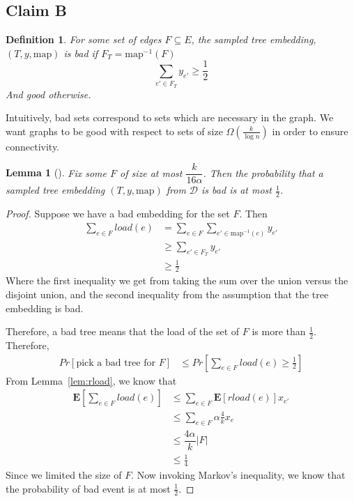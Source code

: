 \documentclass[12pt]{article}
\newtheorem{definition}{Definition}
\newtheorem{lemma}{Lemma}
\begin{document}
\subsection{Claim B}

\begin{definition}
For some set of edges $F \subseteq E$, the sampled tree embedding, $(T, y, \text{map})$ is bad if $F_T = \text{map}^{-1}(F)$ 
\[ \sum_{e' \in F_T} y_{e'} \geq \frac{1}{2} \]
And good otherwise.
\end{definition}

Intuitively, bad sets correspond to sets which are necessary in the graph. We want graphs to be good with respect to sets of size $\Omega(\frac{k}{\log n})$ in order to ensure connectivity.

\begin{lemma}[\cite{ssc}]
\label{lem:notbad}
Fix some $F$ of size at most $\dfrac{k}{16 \alpha}$. Then the probability that a sampled tree embedding $(T, y, \text{map})$ from $\mathcal{D}$ is bad is at most $\frac{1}{2}$. 
\end{lemma} 

\begin{proof}
Suppose we have a bad embedding for the set $F$. Then 
\begin{align}
\sum_{e \in F} load(e)&= \sum_{e \in F} \sum_{e' \in \text{map}^{-1}(e)} y_{e'} \\
                    &\geq \sum_{e' \in F_T} y_{e'} \\
                    &\geq \frac{1}{2}
\end{align}
Where the first inequality we get from taking the sum over the union versus the disjoint union, and the second inequality from the assumption that the tree embedding is bad. 

Therefore, a bad tree means that the load of the set of $F$ is more than $\frac{1}{2}$. Therefore,
\begin{align}
Pr[\text{pick a bad tree for $F$}] &\leq Pr[ \sum_{e\in F} load(e) \geq \frac{1}{2}]
\end{align}
From Lemma~\ref{lem:rload}, we know that
\begin{align}
\textbf{E}[ \sum_{e \in F} load(e) ] &\leq \sum_{e \in F} \textbf{E}[rload(e)]x_{e'} \\
                                   & \leq \sum_{e\in F} \alpha \frac{4}{k} x_{e} \\
                                   & \leq \dfrac{4\alpha}{k} |F| \\
                                   &\leq \frac{1}{4}
\end{align}
Since we limited the size of $F$. Now invoking Markov's inequality, we know that the probability of bad event is at most $\frac{1}{2}$. 
\end{proof}
\end{document}
